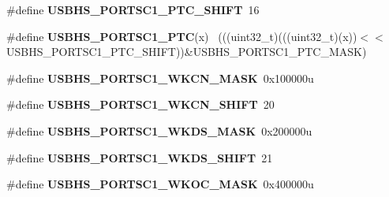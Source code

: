 \begin{DoxyCompactItemize}
\item 
\hypertarget{group___u_s_b_h_s___register___masks_ga4eab8a96ec20dd5a3e9efb6ff662e3ef}{}\#define {\bfseries U\+S\+B\+H\+S\+\_\+\+P\+O\+R\+T\+S\+C1\+\_\+\+P\+T\+C\+\_\+\+S\+H\+I\+F\+T}~16\label{group___u_s_b_h_s___register___masks_ga4eab8a96ec20dd5a3e9efb6ff662e3ef}

\item 
\hypertarget{group___u_s_b_h_s___register___masks_ga944fe18938a8231b47a4fe33f39d7f28}{}\#define {\bfseries U\+S\+B\+H\+S\+\_\+\+P\+O\+R\+T\+S\+C1\+\_\+\+P\+T\+C}(x)                                      ~(((uint32\+\_\+t)(((uint32\+\_\+t)(x))$<$$<$U\+S\+B\+H\+S\+\_\+\+P\+O\+R\+T\+S\+C1\+\_\+\+P\+T\+C\+\_\+\+S\+H\+I\+F\+T))\&U\+S\+B\+H\+S\+\_\+\+P\+O\+R\+T\+S\+C1\+\_\+\+P\+T\+C\+\_\+\+M\+A\+S\+K)\label{group___u_s_b_h_s___register___masks_ga944fe18938a8231b47a4fe33f39d7f28}

\item 
\hypertarget{group___u_s_b_h_s___register___masks_ga65dfa2d306429d2ea35b8d89e3ce6129}{}\#define {\bfseries U\+S\+B\+H\+S\+\_\+\+P\+O\+R\+T\+S\+C1\+\_\+\+W\+K\+C\+N\+\_\+\+M\+A\+S\+K}~0x100000u\label{group___u_s_b_h_s___register___masks_ga65dfa2d306429d2ea35b8d89e3ce6129}

\item 
\hypertarget{group___u_s_b_h_s___register___masks_ga545b28a356acf182e651f4062bfa175d}{}\#define {\bfseries U\+S\+B\+H\+S\+\_\+\+P\+O\+R\+T\+S\+C1\+\_\+\+W\+K\+C\+N\+\_\+\+S\+H\+I\+F\+T}~20\label{group___u_s_b_h_s___register___masks_ga545b28a356acf182e651f4062bfa175d}

\item 
\hypertarget{group___u_s_b_h_s___register___masks_ga007088ce2183c3f9009e325561c6c2d2}{}\#define {\bfseries U\+S\+B\+H\+S\+\_\+\+P\+O\+R\+T\+S\+C1\+\_\+\+W\+K\+D\+S\+\_\+\+M\+A\+S\+K}~0x200000u\label{group___u_s_b_h_s___register___masks_ga007088ce2183c3f9009e325561c6c2d2}

\item 
\hypertarget{group___u_s_b_h_s___register___masks_ga9c03daa28d738f9de83092b4b41392e1}{}\#define {\bfseries U\+S\+B\+H\+S\+\_\+\+P\+O\+R\+T\+S\+C1\+\_\+\+W\+K\+D\+S\+\_\+\+S\+H\+I\+F\+T}~21\label{group___u_s_b_h_s___register___masks_ga9c03daa28d738f9de83092b4b41392e1}

\item 
\hypertarget{group___u_s_b_h_s___register___masks_ga19c9d312581f2c8fb88a58434247c556}{}\#define {\bfseries U\+S\+B\+H\+S\+\_\+\+P\+O\+R\+T\+S\+C1\+\_\+\+W\+K\+O\+C\+\_\+\+M\+A\+S\+K}~0x400000u\label{group___u_s_b_h_s___register___masks_ga19c9d312581f2c8fb88a58434247c556}


\end{DoxyCompactItemize}
